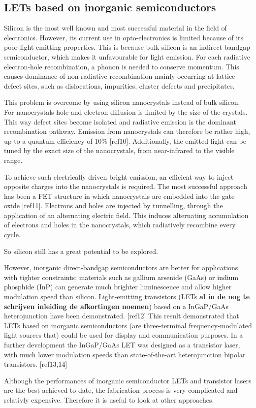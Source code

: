 \subsection{LETs based on inorganic semiconductors} %

Silicon is the most well known and most successful material in the field of electronics. However, its current use in opto-electronics is limited because of its poor light-emitting properties. This is because bulk silicon is an indirect-bandgap semiconductor, which makes it unfavourable for light emission. For each radiative electron-hole recombination, a phonon is needed to conserve momentum. This causes dominance of non-radiative recombination mainly occurring at lattice defect sites, such as dislocations, impurities, cluster defects and precipitates.

This problem is overcome by using silicon nanocrystals instead of bulk silicon. For nanocrystals hole and electron diffusion is limited by the size of the crystals. This way defect sites become isolated and radiative emission is the dominant recombination pathway. Emission from nanocrystals can therefore be rather high, up to a quantum efficiency of  10\% [ref10]. Additionally, the emitted light can be tuned by the exact size of the nanocrystals, from near-infrared to the visible range. 

To achieve such electrically driven bright emission, an efficient way to inject opposite charges into the nanocrystals is required. The most successful approach has been a FET structure in which nanocrystals are embedded into the gate oxide [ref11]. Electrons and holes are injected by tunnelling, through the application of an alternating electric field. This induces alternating accumulation of electrons and holes in the nanocrystals, which radiatively recombine every cycle.

So silicon still has a great potential to be explored.

However, inorganic direct-bandgap semiconductors are better for applications with tighter constraints; materials such as gallium arsenide (GaAs) or indium phosphide (InP) can generate much brighter luminescence and allow higher modulation speed than silicon. Light-emitting transistors (LETs \textbf{al in de nog te schrijven inleiding de afkortingen noemen}) based on a InGaP/GaAs heterojunction have been demonstrated. [ref12] This result demonstrated that LETs based on inorganic semiconductors (are three-terminal frequency-modulated light sources that) could be used for display and communication purposes. In a further development the InGaP/GaAs LET was designed as a transistor laser, with much lower modulation speeds than state-of-the-art heterojunction bipolar transistors. [ref13,14]

Although the performances of inorganic semiconductor LETs and transistor lasers are the best achieved to date, the fabrication process is very complicated and relativly expensive. Therefore it is useful to look at other approaches.
